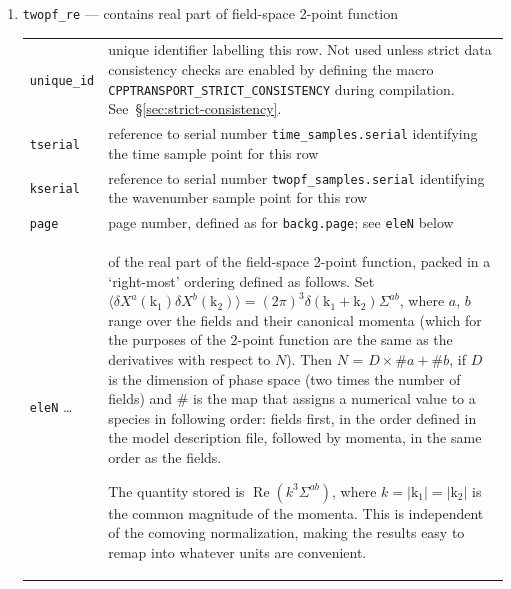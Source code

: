 \documentclass[11pt,a4paper]{article}
\newcommand{\vect}[1]{\bm{\mathrm{{#1}}}}
\newcommand{\semibold}[1]{{\fontseries{b}\selectfont{#1}}}
\newenvironment{sqltablelist}{\renewcommand{\arraystretch}{1.3}\small}{}
\DeclareMathOperator{\realpart}{Re}
\renewcommand{\Re}{\realpart}
\begin{document}
\begin{sqltablelist}
\begin{enumerate}
    \item \texttt{twopf_re} --- contains real part of field-space 2-point function \\
    \begin{tabular}{p{2.5cm}p{11.2cm}}
        \texttt{unique_id} & unique identifier labelling this row. Not used
        unless strict data consistency checks are enabled
        by defining the macro
        \texttt{CPPTRANSPORT_STRICT_CONSISTENCY} during
        compilation. See~\S\ref{sec:strict-consistency}. \\
        \texttt{tserial} & reference to serial number
        \texttt{time_samples.serial} identifying the time sample point for this row \\
        \texttt{kserial} & reference to serial number
        \texttt{twopf_samples.serial} identifying the wavenumber sample point for this row \\
        \texttt{page} & page number, defined as for \texttt{backg.page}; see
        \texttt{eleN} below \\
        \texttt{eleN} \ldots & \semibold{dimensionless components} of the real part of the field-space 2-point
        function, packed in a `right-most' ordering defined as follows.
        Set $\langle \delta X^a(\vect{k}_1) \delta X^b(\vect{k}_2) \rangle = (2\pi)^3 \delta(\vect{k}_1 + \vect{k}_2)
        \Sigma^{ab}$, where $a$, $b$ range over the fields and their
        canonical momenta
        (which for the purposes of the 2-point function are the same as the
        derivatives with respect to $N$).
        Then $N$ = $D \times \#a + \#b$, if $D$ is the dimension of phase
        space (two times the number of fields)
        and $\#$ is the map that assigns a numerical
        value to a species in following order:
        fields first, in the order defined in the model description file,
        followed by momenta, in the same order as the fields.
        
        The quantity stored is $\Re(k^3 \Sigma^{ab})$,
        where $k = |\vect{k}_1| = |\vect{k}_2|$
        is the common magnitude of the momenta.
        This is independent of the comoving normalization, making the results
        easy to remap into whatever units are convenient.
    \end{tabular}
    

\end{enumerate}
\end{sqltablelist}
\end{document}
